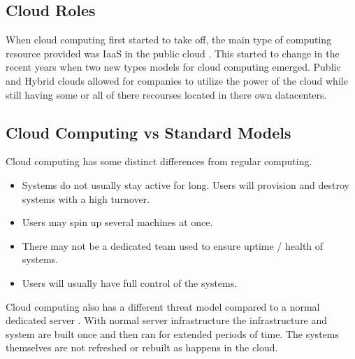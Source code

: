 \documentclass[12pt]{article}
\begin{document}
\subsection{Cloud Roles}
When cloud computing first started to take off, the main type of computing resource provided was IaaS in the public cloud \cite{sourcedigit}. This started to change in the recent years when two new types models for cloud computing emerged. Public and Hybrid clouds allowed for companies to utilize the power of the cloud while still having some or all of there recourses located in there own datacenters.

\subsection{Cloud Computing vs Standard Models}
Cloud computing has some distinct differences from regular computing.

\begin{itemize}
    \item Systems do not usually stay active for long. Users will provision and destroy systems with a high turnover.
    \item Users may spin up several machines at once.
    \item There may not be a dedicated team used to ensure uptime / health of systems.
    \item Users will usually have full control of the systems.
\end{itemize}

Cloud computing also has a different threat model compared to a normal dedicated server \cite{zissis2012addressing, mishra2013cloud, krutz2010cloud}. With normal server infrastructure the infrastructure and system are built once and then ran for extended periods of time. The systems themselves are not refreshed or rebuilt as happens in the cloud.
\end{document}
